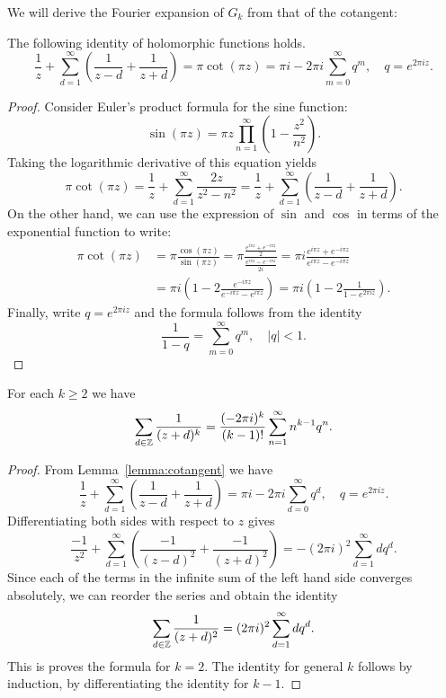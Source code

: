 We will derive the Fourier expansion of $G_k$ from that of the cotangent:
\begin{lemma}
\label{lemma:cotangent}
  The following identity of holomorphic functions holds.
\[
\frac 1z + \sum_{d=1}^\infty\left(\frac 1{z-d} + \frac 1{z+d}\right) = \pi\cot(\pi z) = \pi i - 2\pi i\sum_{m=0}^\infty q^m,\quad q = e^{2\pi i z}.
\]
\end{lemma}
\begin{proof}
  Consider Euler's product formula for the sine function:
\[
\sin(\pi z) = \pi z \prod_{n=1}^\infty \left(1-\frac{z^2}{n^2}\right).
\]
Taking the logarithmic derivative of this equation yields
\[
\pi\cot(\pi z) = \frac 1 z + \sum_{d=1}^\infty \frac{2z}{z^2-n^2} = \frac 1z + \sum_{d=1}^\infty \left(\frac 1{z-d}+\frac 1{z+d}\right).
\]
On the other hand, we can use the expression of $\sin$ and $\cos$ in terms of the exponential function to write:
\begin{align*}
\pi\cot(\pi z)&=\pi \frac{\cos(\pi z)}{\sin(\pi z)} = \pi \frac{\frac{e^{i\pi z} + e^{-i\pi z}}{2}}{\frac{e^{i\pi z} - e^{-i\pi z}}{2i}}=\pi i\frac{e^{i\pi z} + e^{-i\pi z}}{e^{i\pi z} - e^{-i\pi z}}\\
&=\pi i\left(1 - 2\frac{e^{-i\pi z}}{e^{-i\pi z} - e^{i\pi z}}\right)=\pi i\left(1 - 2\frac{1}{1 - e^{2\pi i z}}\right).
\end{align*}
Finally, write $q=e^{2\pi i z}$ and the formula follows from the identity
\[
\frac{1}{1-q} = \sum_{m=0}^\infty q^m,\quad |q|<1.
\]
\end{proof}
\begin{lemma}
\label{lemma:expansion-latticesum}
For each $k\geq 2$ we have
\[
\sum_{d\in\mathbb{Z}}\frac{1}{(z+d)^k} = \frac{(-2\pi i)^k}{(k-1)!}\sum_{n=1}^\infty n^{k-1}q^n.
\]
\end{lemma}
\begin{proof}
From Lemma~\ref{lemma:cotangent} we have
\begin{equation}
\frac 1z + \sum_{d=1}^\infty\left(\frac 1{z-d} + \frac 1{z+d}\right) = \pi i - 2\pi i\sum_{d=0}^\infty q^d,\quad q = e^{2\pi i z}.
\end{equation}
Differentiating both sides with respect to $z$ gives
\[
\frac{-1}{z^2}+\sum_{d=1}^\infty \left(\frac{-1}{(z-d)^2}+\frac{-1}{(z+d)^2}\right) = -(2\pi i)^2 \sum_{d=1}^\infty dq^d.
\]
Since each of the terms in the infinite sum of the left hand side converges absolutely, we can reorder the series and obtain the identity
\[
\sum_{d\in \mathbb{Z}} \frac{1}{(z+d)^2} = (2\pi i)^2\sum_{d=1}^\infty dq^d.
\]
This is proves the formula for $k=2$. The identity for general $k$ follows by induction, by differentiating the identity for $k-1$.
\end{proof}
